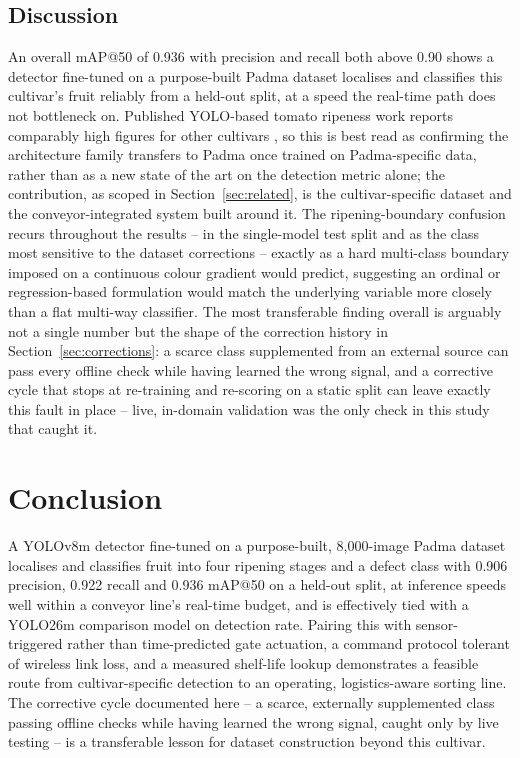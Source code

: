 \documentclass[journal]{IEEEtran}
\begin{document}
\subsection{Discussion}
An overall mAP@50 of 0.936 with precision and recall both above 0.90 shows a detector fine-tuned on a purpose-built Padma dataset localises and classifies this cultivar's fruit reliably from a held-out split, at a speed the real-time path does not bottleneck on. Published YOLO-based tomato ripeness work reports comparably high figures for other cultivars \cite{safira2026,yang2025}, so this is best read as confirming the architecture family transfers to Padma once trained on Padma-specific data, rather than as a new state of the art on the detection metric alone; the contribution, as scoped in Section~\ref{sec:related}, is the cultivar-specific dataset and the conveyor-integrated system built around it. The ripening-boundary confusion recurs throughout the results -- in the single-model test split and as the class most sensitive to the dataset corrections -- exactly as a hard multi-class boundary imposed on a continuous colour gradient would predict, suggesting an ordinal or regression-based formulation would match the underlying variable more closely than a flat multi-way classifier. The most transferable finding overall is arguably not a single number but the shape of the correction history in Section~\ref{sec:corrections}: a scarce class supplemented from an external source can pass every offline check while having learned the wrong signal, and a corrective cycle that stops at re-training and re-scoring on a static split can leave exactly this fault in place -- live, in-domain validation was the only check in this study that caught it.

\section{Conclusion}
A YOLOv8m detector fine-tuned on a purpose-built, 8{,}000-image Padma dataset localises and classifies fruit into four ripening stages and a defect class with 0.906 precision, 0.922 recall and 0.936 mAP@50 on a held-out split, at inference speeds well within a conveyor line's real-time budget, and is effectively tied with a YOLO26m comparison model on detection rate. Pairing this with sensor-triggered rather than time-predicted gate actuation, a command protocol tolerant of wireless link loss, and a measured shelf-life lookup demonstrates a feasible route from cultivar-specific detection to an operating, logistics-aware sorting line. The corrective cycle documented here -- a scarce, externally supplemented class passing offline checks while having learned the wrong signal, caught only by live testing -- is a transferable lesson for dataset construction beyond this cultivar.
\end{document}
